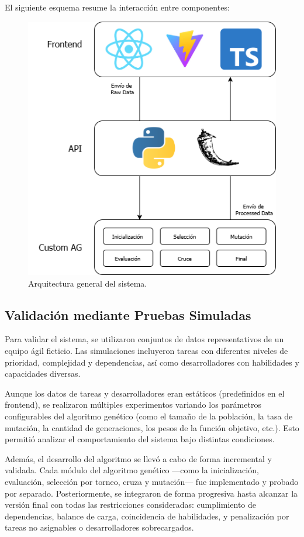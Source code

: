 El siguiente esquema resume la interacción entre componentes:

\begin{figure}[htbp]
    \centering
    \includegraphics[width=12cm]{imagenes/metodo-arqui.png}
    \caption{Arquitectura general del sistema.}
    \label{fig:arquitectura}
\end{figure}

\subsection{Validación mediante Pruebas Simuladas}

Para validar el sistema, se utilizaron conjuntos de datos representativos de un equipo ágil ficticio. Las simulaciones incluyeron tareas con diferentes niveles de prioridad, complejidad y dependencias, así como desarrolladores con habilidades y capacidades diversas.

Aunque los datos de tareas y desarrolladores eran estáticos (predefinidos en el frontend), se realizaron múltiples experimentos variando los parámetros configurables del algoritmo genético (como el tamaño de la población, la tasa de mutación, la cantidad de generaciones, los pesos de la función objetivo, etc.). Esto permitió analizar el comportamiento del sistema bajo distintas condiciones.

Además, el desarrollo del algoritmo se llevó a cabo de forma incremental y validada. Cada módulo del algoritmo genético —como la inicialización, evaluación, selección por torneo, cruza y mutación— fue implementado y probado por separado. Posteriormente, se integraron de forma progresiva hasta alcanzar la versión final con todas las restricciones consideradas: cumplimiento de dependencias, balance de carga, coincidencia de habilidades, y penalización por tareas no asignables o desarrolladores sobrecargados.

